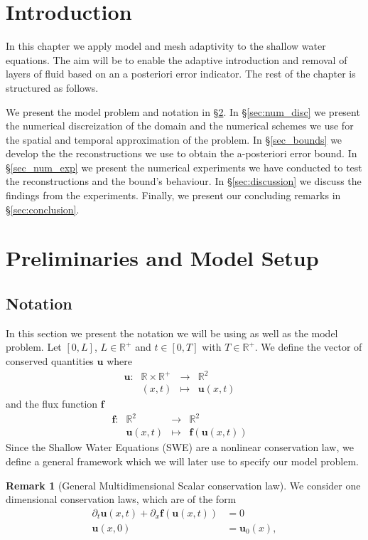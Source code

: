 \documentclass[12pt,a4paper]{article}
\numberwithin{equation}{section}
\theoremstyle{definition}
\newcommand{\dfunkmapsto}[5]{\ensuremath{
		\begin{array}{rccl}
			{#1}: & {#2} &\to&{#3}
			\\
			& {#4} &\mapsto&{#5}
		\end{array}\quad}}
\newcommand{\vect}[1]{\textbf{#1}}
\newcommand{\qp}[1]{\left(#1\right)}
\newcommand{\qb}[1]{\left[#1\right]}
\newtheorem{Rem}[subsection]{Remark}
\begin{document}
\section{Introduction}\label{sec_intro}
In this chapter we apply model and mesh adaptivity to the shallow water equations. The aim will be to enable the adaptive introduction and removal of layers of fluid based on an a posteriori error indicator.  The rest of the chapter is structured as follows.

We present the model problem and notation in \S \ref{sec:setup}.  In \S\ref{sec:num_disc} we present the numerical discreization of the domain and the numerical schemes we use for the spatial and temporal approximation of the problem. In \S \ref{sec_bounds} we develop the the reconstructions we use to obtain the a-posteriori error bound. In \S\ref{sec_num_exp} we present the numerical experiments we have conducted to test the reconstructions and the bound's behaviour.  In \S\ref{sec:discussion} we discuss the findings from the experiments. Finally, we present our concluding remarks in \S \ref{sec:conclusion}.
\section{Preliminaries and Model Setup}\label{sec:setup}
\subsection{Notation}\label{subsec_modelprob}
In this section we present the notation we will be using as well as the model problem.  Let $\qb{0,L}$, $L\in \mathbb{R}^+$ and $t\in \qb{0,T}$ with $T\in \mathbb{R}^+$.  We define the vector of conserved quantities $\vect{u}$  where
\begin{equation}\label{eq_defn_u_multi_d}
\dfunkmapsto{\textbf{u}}{\mathbb{R}\times\mathbb{R}^+}{\mathbb{R}^2}{\qp{x,t}}{\vect{u}\qp{x,t}}
\end{equation}
and the flux function $\vect{f}$
\begin{equation}
\dfunkmapsto{\textbf{f}}{\mathbb{R}^2}{\mathbb{R}^2}{\vect{u}\qp{x,t}}{\vect{f}\qp{\vect{u}\qp{x,t}}}
\end{equation}
Since the Shallow Water Equations (SWE) are a nonlinear conservation law, we define a general framework which we will later use to specify our model problem.
\begin{Rem}[General Multidimensional Scalar conservation law] We consider one dimensional conservation laws, which are of the form
	\begin{equation}\label{eq_gen_hyp_conservation_law}
	\begin{aligned}
	\partial_t \vect{u}\qp{{x},t}+\partial_x{ \vect{f}\qp{\vect{u}\qp{ x,t}}}&=0\\
	\vect{u}\qp{ x,0}&=\vect{u}_0\qp{ {x}},
	\end{aligned}
	\end{equation}
\end{Rem}
\end{document}
